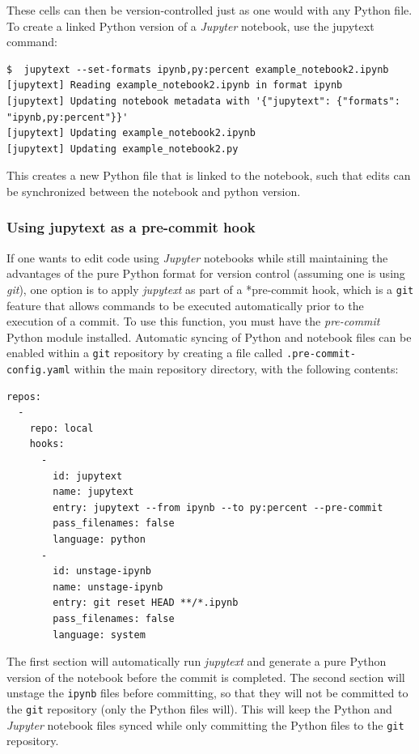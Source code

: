 These cells can then be version-controlled just as one would with any Python file. To create a linked Python version of a \textit{Jupyter} notebook, use the jupytext command:

\begin{lstlisting}[style=shell]
$  jupytext --set-formats ipynb,py:percent example_notebook2.ipynb
[jupytext] Reading example_notebook2.ipynb in format ipynb
[jupytext] Updating notebook metadata with '{"jupytext": {"formats": "ipynb,py:percent"}}'
[jupytext] Updating example_notebook2.ipynb
[jupytext] Updating example_notebook2.py
\end{lstlisting}

This creates a new Python file that is linked to the notebook, such that edits can be synchronized between the notebook and python version.

\subsubsection{Using jupytext as a pre-commit hook}

If one wants to edit code using \textit{Jupyter} notebooks while still maintaining the advantages of the pure Python format for version control (assuming one is using \textit{git}), one option is to apply \textit{jupytext} as part of a *pre-commit hook, which is a \texttt{git} feature that allows commands to be executed automatically prior to the execution of a commit. To use this function, you must have the \textit{pre-commit} Python module installed.   Automatic syncing of Python and notebook files can be enabled within a \texttt{git} repository by creating a file called \texttt{.pre-commit-config.yaml} within the main repository directory, with the following contents:

\begin{lstlisting}[style=yaml]
repos:
  -
    repo: local
    hooks:
      -
        id: jupytext
        name: jupytext
        entry: jupytext --from ipynb --to py:percent --pre-commit
        pass_filenames: false
        language: python
      -
        id: unstage-ipynb
        name: unstage-ipynb
        entry: git reset HEAD **/*.ipynb
        pass_filenames: false
        language: system
\end{lstlisting}

The first section will automatically run \textit{jupytext} and generate a pure Python version of the notebook before the commit is completed.  The second section will unstage the \texttt{ipynb} files before committing, so that they will not be committed to the \texttt{git} repository (only the Python files will). This will keep the Python and \textit{Jupyter} notebook files synced while only committing the Python files to the \texttt{git} repository.

